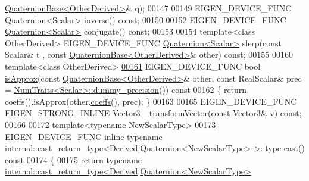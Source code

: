 \begin{DoxyCode}
      \hyperlink{group___geometry___module_class_eigen_1_1_quaternion_base}{QuaternionBase<OtherDerived>}& q);
00147 
00149   EIGEN\_DEVICE\_FUNC \hyperlink{group___geometry___module_class_eigen_1_1_quaternion}{Quaternion<Scalar>} inverse() \textcolor{keyword}{const};
00150 
00152   EIGEN\_DEVICE\_FUNC \hyperlink{group___geometry___module_class_eigen_1_1_quaternion}{Quaternion<Scalar>} conjugate() \textcolor{keyword}{const};
00153 
00154   \textcolor{keyword}{template}<\textcolor{keyword}{class} OtherDerived> EIGEN\_DEVICE\_FUNC \hyperlink{group___geometry___module_class_eigen_1_1_quaternion}{Quaternion<Scalar>} slerp(\textcolor{keyword}{const} Scalar& t
      , \textcolor{keyword}{const} \hyperlink{group___geometry___module_class_eigen_1_1_quaternion_base}{QuaternionBase<OtherDerived>}& other) \textcolor{keyword}{const};
00155 
00160   \textcolor{keyword}{template}<\textcolor{keyword}{class} OtherDerived>
\hyperlink{group___geometry___module_a83c9e817b726fb798d3f2e15002a4241}{00161}   EIGEN\_DEVICE\_FUNC \textcolor{keywordtype}{bool} \hyperlink{group___geometry___module_a83c9e817b726fb798d3f2e15002a4241}{isApprox}(\textcolor{keyword}{const} \hyperlink{group___geometry___module_class_eigen_1_1_quaternion_base}{QuaternionBase<OtherDerived>}& 
      other, \textcolor{keyword}{const} RealScalar& prec = \hyperlink{group___core___module_struct_eigen_1_1_num_traits}{NumTraits<Scalar>::dummy\_precision}())\textcolor{keyword}{ const}
00162 \textcolor{keyword}{  }\{ \textcolor{keywordflow}{return} coeffs().isApprox(other.\hyperlink{group___geometry___module_aa7bb3fc337ffa82b0ad795783eb8a2ce}{coeffs}(), prec); \}
00163 
00165   EIGEN\_DEVICE\_FUNC EIGEN\_STRONG\_INLINE Vector3 \_transformVector(\textcolor{keyword}{const} Vector3& v) \textcolor{keyword}{const};
00166 
00172   \textcolor{keyword}{template}<\textcolor{keyword}{typename} NewScalarType>
\hyperlink{group___geometry___module_a0ba6cd48ef9b2d850eb99bfaf27474de}{00173}   EIGEN\_DEVICE\_FUNC \textcolor{keyword}{inline} \textcolor{keyword}{typename} 
      \hyperlink{struct_eigen_1_1internal_1_1cast__return__type}{internal::cast\_return\_type<Derived,Quaternion<NewScalarType>}
       >::type \hyperlink{group___geometry___module_a0ba6cd48ef9b2d850eb99bfaf27474de}{cast}()\textcolor{keyword}{ const}
00174 \textcolor{keyword}{  }\{
00175     \textcolor{keywordflow}{return} \textcolor{keyword}{typename} \hyperlink{struct_eigen_1_1internal_1_1cast__return__type}{internal::cast\_return\_type<Derived,Quaternion<NewScalarType>}

\end{DoxyCode}
